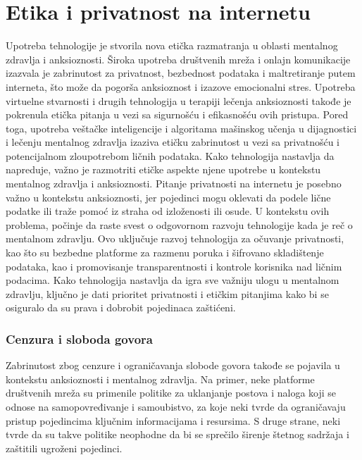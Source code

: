 \documentclass[a4paper]{article}
\begin{document}
        \section{Etika i privatnost na internetu}
	\label{sec:podnaslov2}
            Upotreba tehnologije je stvorila nova etička razmatranja u oblasti mentalnog zdravlja i anksioznosti. Široka upotreba društvenih mreža i onlajn komunikacije izazvala je zabrinutost za privatnost, bezbednost podataka i maltretiranje putem interneta, što može da pogorša anksioznost i izazove emocionalni stres. Upotreba virtuelne stvarnosti i drugih tehnologija u terapiji lečenja anksioznosti takođe je pokrenula etička pitanja u vezi sa sigurnošću i efikasnošću ovih pristupa. Pored toga, upotreba veštačke inteligencije i algoritama mašinskog učenja u dijagnostici i lečenju mentalnog zdravlja izaziva etičku zabrinutost u vezi sa privatnošću i potencijalnom zloupotrebom ličnih podataka. Kako tehnologija nastavlja da napreduje, važno je razmotriti etičke aspekte njene upotrebe u kontekstu mentalnog zdravlja i anksioznosti. Pitanje privatnosti na internetu je posebno važno u kontekstu anksioznosti, jer pojedinci mogu oklevati da podele lične podatke ili traže pomoć iz straha od izloženosti ili osude. U kontekstu ovih problema, počinje da raste svest o odgovornom razvoju tehnologije kada je reč o mentalnom zdravlju. Ovo uključuje razvoj tehnologija za očuvanje privatnosti, kao što su bezbedne platforme za razmenu poruka i šifrovano skladištenje podataka, kao i promovisanje transparentnosti i kontrole korisnika nad ličnim podacima. Kako tehnologija nastavlja da igra sve važniju ulogu u mentalnom zdravlju, ključno je dati prioritet privatnosti i etičkim pitanjima kako bi se osiguralo da su prava i dobrobit pojedinaca zaštićeni.

            \subsubsection{Cenzura i sloboda govora}
            Zabrinutost zbog cenzure i ograničavanja slobode govora takođe se pojavila u kontekstu anksioznosti i mentalnog zdravlja. Na primer, neke platforme društvenih mreža su primenile politike za uklanjanje postova i naloga koji se odnose na samopovređivanje i samoubistvo, za koje neki tvrde da ograničavaju pristup pojedincima ključnim informacijama i resursima. S druge strane, neki tvrde da su takve politike neophodne da bi se sprečilo širenje štetnog sadržaja i zaštitili ugroženi pojedinci. \\
\end{document}
